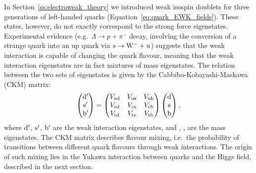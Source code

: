 In Section~\ref{ss:electroweak_theory} we introduced weak isospin doublets for three generations of left-handed quarks
(Equation~\ref{eq:quark_EWK_fields}). These states, however, do not exactly correspond to the strong force eigenstates.
Experimental evidence (e.g.\ $\Lambda \rightarrow p + \pi^-$ decay, involving the conversion of a strange quark into an
up quark via $\mathrm{s} \rightarrow \mathrm{W}^- + \mathrm{u}$) suggests that the weak interaction is capable of changing the quark
flavour, meaning that the weak interaction eigenstates are in fact mixtures of mass eigenstates. The relation between
the two sets of eigenstates is given by the Cabbibo-Kobayashi-Maskawa (CKM) matrix:
\begin{equation}
\begin{pmatrix} \mathrm{d}' \\ \mathrm{s}' \\ \mathrm{b}' \end{pmatrix}
=
\begin{pmatrix}
V_{\mathrm{u}\mathrm{d}} & V_{\mathrm{u}\mathrm{s}} & V_{\mathrm{u}\mathrm{b}}  \\
V_{\mathrm{c}\mathrm{d}} & V_{\mathrm{c}\mathrm{s}} & V_{\mathrm{c}\mathrm{b}}  \\
V_{\mathrm{t}\mathrm{d}} & V_{\mathrm{t}\mathrm{s}} & V_{\mathrm{t}\mathrm{b}}
\end{pmatrix}
\begin{pmatrix} \mathrm{d} \\ \mathrm{s} \\ \mathrm{b} \end{pmatrix},
\label{eq:CKM}
\end{equation}
where $\mathrm{d}'$, $\mathrm{s}'$, $\mathrm{b}'$ are the weak interaction eigenstates, and \cPqd, \cPqs, \cPqb are the mass
eigenstates. The CKM matrix describes flavour mixing, i.e.\ the probability of transitions between different quark
flavours through weak interactions. The origin of such mixing lies in the Yukawa interaction between quarks and the
Higgs field, described in the next section.


